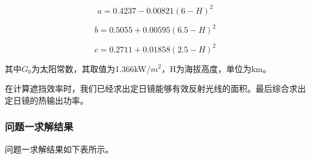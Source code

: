 \documentclass[withoutpreface,bwprint]{cumcmthesis} %
\begin{document}
\begin{equation}
    a=0.4237-0.00821(6-H)^2
\end{equation}

\begin{equation}
    b=0.5055+0.00595(6.5-H)^2
\end{equation}

\begin{equation}
    c=0.2711+0.01858(2.5-H)^2
\end{equation}

其中$G_{0}$为太阳常数，其取值为1.366kW/$m^2$，H为海拔高度，单位为km。

在计算遮挡效率时，我们已经求出定日镜能够有效反射光线的面积。最后综合求出定日镜的热输出功率。

\subsubsection{问题一求解结果}

问题一求解结果如下表所示。
\end{document}
